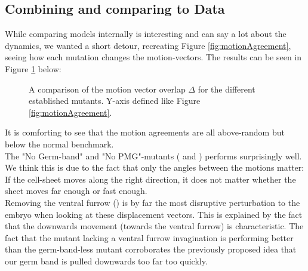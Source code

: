 \subsection{Combining and comparing to Data}
While comparing models internally is interesting and can say a lot about the dynamics, we wanted a short detour, recreating Figure \ref{fig:motionAgreement}, seeing how each mutation changes the motion-vectors. The results can be seen in Figure \ref{fig:compare-motionAgreement-time} below:

\begin{figure}[H]
    \centering
    \caption{A comparison of the motion vector overlap $\Delta$ for the different established mutants. Y-axis defined like Figure \ref{fig:motionAgreement}.}
    \label{fig:compare-motionAgreement-time}
\end{figure}
It is comforting to see that the motion agreements are all above-random but below the normal benchmark.\\

The "No Germ-band" and "No PMG"-mutants ( and ) performs surprisingly well. We think this is due to the fact that only the angles between the motions matter: If the cell-sheet moves along the right direction, it does not matter whether the sheet moves far enough or fast enough.\\

Removing the ventral furrow () is by far the most disruptive perturbation to the embryo when looking at these displacement vectors. This is explained by the fact that the downwards movement (towards the ventral furrow) is characteristic. The fact that the mutant lacking a ventral furrow invagination is performing better than the germ-band-less mutant corroborates the previously proposed idea that our germ band is pulled downwards too far too quickly.\\

